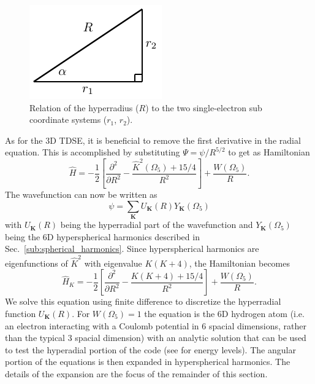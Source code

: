 \begin{figure}[h!]
\centering
\includegraphics[width=0.3\linewidth]{figs/Two_electron/hyperradius.pdf}
\caption{Relation of the hyperradius ($R$) to the two single-electron sub coordinate systems ($r_1$, $r_2$).} 
  \label{fig:hyperradius}
\end{figure}

As for the 3D TDSE, it is beneficial to remove the first derivative in the radial equation. This is accomplished by substituting $\Psi = \psi/R^{5/2}$ to get as Hamiltonian
\begin{equation}
   \hat{H} = -\frac{1}{2} \left[\frac{\partial^2}{\partial R^2} - \frac{\hat{K}^2(\Omega_5)+15/4}{R^2}\right] + \frac{W(\Omega_5)}{R}.
\end{equation}
The wavefunction can now be written as
\begin{equation}
    \psi = \sum\limits_{\mathbf{K}} U_{\mathbf{K}}(R) Y_{\mathbf{K}}(\Omega_5)
\end{equation}
with $U_{\mathbf{K}}(R)$ being the hyperradial part of the wavefunction and $Y_{\mathbf{K}}(\Omega_5)$ being the 6D hyperspherical harmonics described in Sec.~\ref{sub:spherical_harmonics}. Since hyperspherical harmonics are eigenfunctions of $\hat{K}^2$ with eigenvalue $K(K+4)$, the Hamiltonian becomes
\begin{equation}
   \hat{H}_{K} = -\frac{1}{2} \left[\frac{\partial^2}{\partial R^2} - \frac{K(K+4)+15/4}{R^2}\right] + \frac{W(\Omega_5)}{R}.
\end{equation}
We solve this equation using finite difference to discretize the hyperradial function $U_{\mathbf{K}}(R)$. For $W(\Omega_5)=1$ the equation is the 6D hydrogen atom (i.e. an electron interacting with a Coulomb potential in 6 spacial dimensions, rather than the typical 3 spacial dimension) with an analytic solution that can be used to test the hyperadial portion of the code (see \cite{sorevik2005} for energy levels). The angular portion of the equations is then expanded in hyperspherical harmonics. The details of the expansion are the focus of the remainder of this section.

